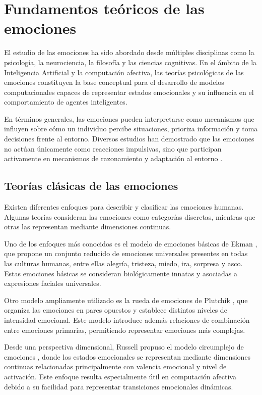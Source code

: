 \section{Fundamentos teóricos de las emociones}

El estudio de las emociones ha sido abordado desde múltiples disciplinas como la psicología, la neurociencia, la filosofía y las ciencias cognitivas. En el ámbito de la Inteligencia Artificial y la computación afectiva, las teorías psicológicas de las emociones constituyen la base conceptual para el desarrollo de modelos computacionales capaces de representar estados emocionales y su influencia en el comportamiento de agentes inteligentes.

En términos generales, las emociones pueden interpretarse como mecanismos que influyen sobre cómo un individuo percibe situaciones, prioriza información y toma decisiones frente al entorno. Diversos estudios han demostrado que las emociones no actúan únicamente como reacciones impulsivas, sino que participan activamente en mecanismos de razonamiento y adaptación al entorno \cite{alfonso2021affect}.

\subsection{Teorías clásicas de las emociones}

Existen diferentes enfoques para describir y clasificar las emociones humanas. Algunas teorías consideran las emociones como categorías discretas, mientras que otras las representan mediante dimensiones continuas.

Uno de los enfoques más conocidos es el modelo de emociones básicas de Ekman \cite{ekman1992argument}, que propone un conjunto reducido de emociones universales presentes en todas las culturas humanas, entre ellas alegría, tristeza, miedo, ira, sorpresa y asco. Estas emociones básicas se consideran biológicamente innatas y asociadas a expresiones faciales universales.

Otro modelo ampliamente utilizado es la rueda de emociones de Plutchik \cite{plutchik1980general}, que organiza las emociones en pares opuestos y establece distintos niveles de intensidad emocional. Este modelo introduce además relaciones de combinación entre emociones primarias, permitiendo representar emociones más complejas.

Desde una perspectiva dimensional, Russell propuso el modelo circumplejo de emociones \cite{russell1980circumplex}, donde los estados emocionales se representan mediante dimensiones continuas relacionadas principalmente con valencia emocional y nivel de activación. Este enfoque resulta especialmente útil en computación afectiva debido a su facilidad para representar transiciones emocionales dinámicas.

